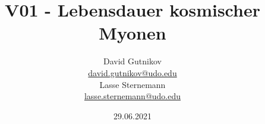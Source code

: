 

\title{V01 - Lebensdauer kosmischer Myonen}
\author{
  David Gutnikov\\
  \href{mailto:david.gutnikov@udo.edu}{david.gutnikov@udo.edu}\\
  Lasse Sternemann\\
  \href{mailto:lasse.sternemann@udo.edu}{lasse.sternemann@udo.edu}
}
\date{29.06.2021}


    \maketitle
    \newpage
    \tableofcontents
    \newpage

    
    
    
    
    

    \newpage
    \printbibliography

